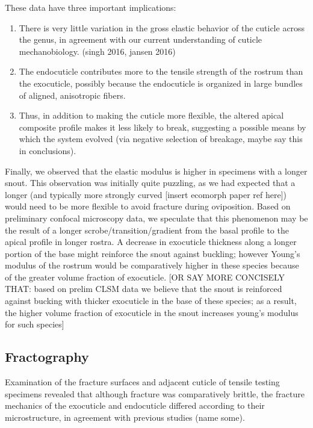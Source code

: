 \documentclass[twocolumn, linenumbers, superscriptaddress]{revtex4-1}
\begin{document}
			These data have three important implications:
			\begin{enumerate}
				\item There is very little variation in the gross elastic behavior of the cuticle across the genus, in agreement with our current understanding of cuticle mechanobiology. (singh 2016, jansen 2016)
				\item The endocuticle contributes more to the tensile strength of the rostrum than the exocuticle, possibly because the endocuticle is organized in large bundles of aligned, anisotropic fibers.
				\item Thus, in addition to making the cuticle more flexible, the altered apical composite profile makes it less likely to break, suggesting a possible means by which the system evolved (via negative selection of breakage, maybe say this in conclusions).
			\end{enumerate}
			
			Finally, we observed that the elastic modulus is higher in specimens with a longer snout.
			This observation was initially quite puzzling, as we had expected that a longer (and typically more strongly curved [insert ecomorph paper ref here]) would need to be more flexible to avoid fracture during oviposition.
			Based on preliminary confocal microscopy data, we speculate that this phenomenon may be the result of a longer scrobe/transition/gradient from the basal profile to the apical profile in longer rostra.
			A decrease in exocuticle thickness along a longer portion of the base might reinforce the snout against buckling; however Young's modulus of the rostrum would be comparatively higher in these species because of the greater volume fraction of exocuticle.
			[OR SAY MORE CONCISELY THAT: based on prelim CLSM data we believe that the snout is reinforced against bucking with thicker exocuticle in the base of these species; as a result, the higher volume fraction of exocuticle in the snout increases young's modulus for such species]
			
		\subsection{Fractography}
			Examination of the fracture surfaces and adjacent cuticle of tensile testing specimens revealed that although fracture was comparatively brittle, the fracture mechanics of the exocuticle and endocuticle differed according to their microstructure, in agreement with previous studies (name some).
			
\end{document}
